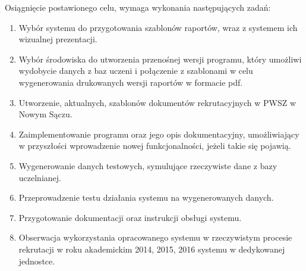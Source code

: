 Osiągnięcie postawionego celu, wymaga wykonania następujących zadań:
\begin{enumerate}
\item Wybór systemu do przygotowania szablonów raportów, wraz z systemem ich wizualnej prezentacji.
\item Wybór środowiska do utworzenia przenośnej wersji programu, który umożliwi wydobycie danych z baz uczeni i połączenie z szablonami w celu wygenerowania drukowanych wersji raportów w formacie pdf.
\item Utworzenie, aktualnych, szablonów dokumentów rekrutacyjnych w PWSZ w Nowym Sączu.
\item Zaimplementowanie programu oraz jego opis dokumentacyjny, umożliwiający w przyszłości wprowadzenie nowej funkcjonalności, jeżeli takie się pojawią.
\item Wygenerowanie danych testowych, symulujące rzeczywiste dane z bazy uczelnianej.
\item Przeprowadzenie testu działania systemu na wygenerowanych danych.
\item Przygotowanie dokumentacji oraz instrukcji obsługi systemu.
\item Obserwacja wykorzystania opracowanego systemu w rzeczywistym procesie rekrutacji w roku akademickim 2014, 2015, 2016 systemu w dedykowanej jednostce.
\end{enumerate}
